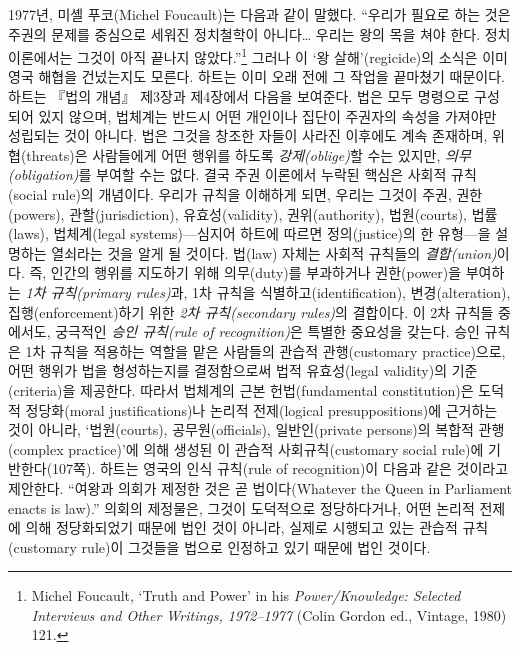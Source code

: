 \documentclass[12pt, oneside]{book}  %
\begin{document}
1977년, 미셸 푸코(Michel Foucault)는 다음과 같이 말했다. ``우리가 필요로
하는 것은 주권의 문제를 중심으로 세워진 정치철학이 아니다\ldots{} 우리는
왕의 목을 쳐야 한다. 정치이론에서는 그것이 아직 끝나지
않았다.''\footnote{Michel Foucault, `Truth and Power' in his
  \emph{Power/Knowledge: Selected Interviews and Other Writings,
  1972--1977} (Colin Gordon ed., Vintage, 1980) 121.} 그러나 이 `왕
살해'(regicide)의 소식은 이미 영국 해협을 건넜는지도 모른다. 하트는 이미
오래 전에 그 작업을 끝마쳤기 때문이다. 하트는 『법의 개념』 제3장과
제4장에서 다음을 보여준다. 법은 모두 명령으로 구성되어 있지 않으며,
법체계는 반드시 어떤 개인이나 집단이 주권자의 속성을 가져야만 성립되는
것이 아니다. 법은 그것을 창조한 자들이 사라진 이후에도 계속 존재하며,
위협(threats)은 사람들에게 어떤 행위를 하도록 \emph{강제(oblige)}할 수는
있지만, \emph{의무(obligation)}를 부여할 수는 없다. 결국 주권 이론에서
누락된 핵심은 사회적 규칙(social rule)의 개념이다. 우리가 규칙을
이해하게 되면, 우리는 그것이 주권, 권한(powers), 관할(jurisdiction),
유효성(validity), 권위(authority), 법원(courts), 법률(laws),
법체계(legal systems)---심지어 하트에 따르면 정의(justice)의 한
유형---을 설명하는 열쇠라는 것을 알게 될 것이다. 법(law) 자체는 사회적
규칙들의 \emph{결합(union)}이다. 즉, 인간의 행위를 지도하기 위해
의무(duty)를 부과하거나 권한(power)을 부여하는 \emph{1차 규칙(primary
rules)}과, 1차 규칙을 식별하고(identification), 변경(alteration),
집행(enforcement)하기 위한 \emph{2차 규칙(secondary rules)}의 결합이다.
이 2차 규칙들 중에서도, 궁극적인 \emph{승인 규칙(rule of recognition)}은
특별한 중요성을 갖는다. 승인 규칙은 1차 규칙을 적용하는 역할을 맡은
사람들의 관습적 관행(customary practice)으로, 어떤 행위가 법을
형성하는지를 결정함으로써 법적 유효성(legal validity)의 기준(criteria)을
제공한다. 따라서 법체계의 근본 헌법(fundamental constitution)은 도덕적
정당화(moral justifications)나 논리적 전제(logical presuppositions)에
근거하는 것이 아니라, `법원(courts), 공무원(officials), 일반인(private
persons)의 복합적 관행(complex practice)'에 의해 생성된 이 관습적
사회규칙(customary social rule)에 기반한다(107쪽). 하트는 영국의 인식
규칙(rule of recognition)이 다음과 같은 것이라고 제안한다. ``여왕과
의회가 제정한 것은 곧 법이다(Whatever the Queen in Parliament enacts is
law).'' 의회의 제정물은, 그것이 도덕적으로 정당하다거나, 어떤 논리적
전제에 의해 정당화되었기 때문에 법인 것이 아니라, 실제로 시행되고 있는
관습적 규칙(customary rule)이 그것들을 법으로 인정하고 있기 때문에 법인
것이다.
\end{document}

